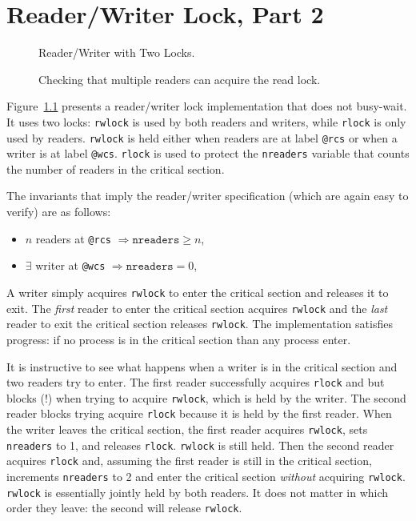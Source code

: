 \documentclass{report}
\newenvironment{code}{
\tcolorbox
}{
\endtcolorbox
}
\begin{document}
\chapter{Reader/Writer Lock, Part 2}

\begin{figure}
\begin{code}
\end{code}
\caption{Reader/Writer with Two Locks.}
\label{fig:rw2lock}
\end{figure}

\begin{figure}
\begin{code}
\end{code}
\caption{Checking that multiple readers can acquire the read lock.}
\label{fig:rwmulti}
\end{figure}

Figure~\ref{fig:rw2lock} presents a reader/writer lock implementation
that does not busy-wait.
It uses two locks: \texttt{rwlock} is used by both readers and writers,
while \texttt{rlock} is only used by readers.
\texttt{rwlock} is held either when readers are at label \texttt{@rcs}
or when a writer is at label \texttt{@wcs}.
\texttt{rlock} is used to protect the \texttt{nreaders} variable that
counts the number of readers in the critical section. 

The invariants that imply the reader/writer specification
(which are again easy to verify) are as follows:

\begin{itemize}
\item $n$ readers at \texttt{@rcs} $\Rightarrow \mathtt{nreaders} \ge n$,
\item $\exists$ writer at \texttt{@wcs} $\Rightarrow \mathtt{nreaders} = 0$,
\end{itemize}

A writer simply acquires \texttt{rwlock} to enter the critical section
and releases it to exit.  The \emph{first} reader to enter the critical
section acquires \texttt{rwlock} and the \emph{last} reader to exit
the critical section releases \texttt{rwlock}.
The implementation satisfies progress: if no process is in the critical
section than any process enter.

It is instructive to see what happens when a writer is in the critical
section and two readers try to enter.  The first reader successfully
acquires \texttt{rlock} and but blocks (!) when trying to acquire
\texttt{rwlock}, which is held by the writer.  The second reader blocks
trying acquire \texttt{rlock} because it is held by the first reader.
When the writer leaves the critical section, the first reader acquires
\texttt{rwlock}, sets \texttt{nreaders} to 1, and releases \texttt{rlock}.
\texttt{rwlock} is still held.
Then the second reader acquires \texttt{rlock} and, assuming the first
reader is still in the critical section, increments \texttt{nreaders} to 2
and enter the critical section \emph{without} acquiring \texttt{rwlock}.
\texttt{rwlock} is essentially jointly held by both readers.
It does not matter in which order they leave: the second will release
\texttt{rwlock}.
\end{document}
